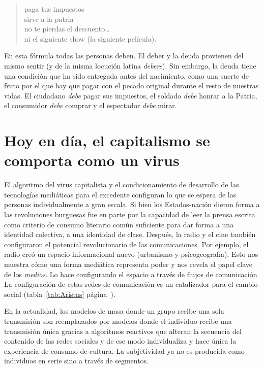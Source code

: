 \begin{quote}
	paga tus impuestos\\ 
	sirve a la patria\\
	no te pierdas el descuento\ldots{}\\ 
	ni el siguiente show (la siguiente película).
\end{quote}

En esta fórmula todas las personas deben. El deber y la deuda provienen del mismo sentir (y de la misma locución latina \emph{debere}). Sin embargo, la deuda tiene una condición que ha sido entregada antes del nacimiento, como una suerte de fruto por el que hay que pagar con el pecado original durante el resto de nuestras vidas. El ciudadano \emph{debe} pagar sus impuestos, el soldado \emph{debe} honrar a la Patria, el consumidor \emph{debe} comprar y el espectador \emph{debe} mirar.

\section{Hoy en día, el capitalismo se comporta como un virus}
\label{sec:viruscapitalista}

El algoritmo del virus capitalista y el condicionamiento de desarrollo de las tecnologías mediáticas para el excedente configuran lo que se espera de las personas individualmente a gran escala. Si bien los Estados-nación dieron forma a las revoluciones burguesas fue en parte por la capacidad de leer la prensa escrita como criterio de consumo literario común suficiente para dar forma a una identidad colectiva, a una identidad de clase. Después, la radio y el cine también configuraron el potencial revolucionario de las comunicaciones. Por ejemplo, el radio creó un espacio informacional nuevo (urbanismo y psicogeografía). Esto nos muestra cómo una forma mediática representa poder y nos revela el papel clave de los \emph{medios}. Lo hace configurando el espacio a través de flujos de comunicación. La configuración de estas redes de comunicación es un catalizador para el cambio social (tabla~\ref{tab:Aristas} página~\pageref{tab:Aristas}).

En la actualidad, los modelos de masa donde un grupo recibe una sola transmisión son reemplazados por modelos donde el individuo recibe una transmisión única gracias a algoritmos reactivos que alteran la secuencia del contenido de las redes sociales y de ese modo individualiza y hace única la experiencia de consumo de cultura. La subjetividad ya no es producida como individuos en serie sino a través de segmentos.

